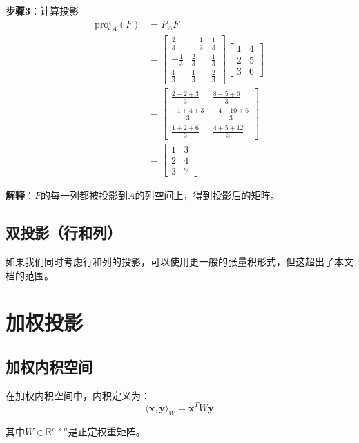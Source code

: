 \documentclass[12pt,a4paper]{article}
\begin{document}
\textbf{步骤3}：计算投影
\begin{align}
\text{proj}_{A}(F) &= P_A F \\
&= \begin{bmatrix} \frac{2}{3} & -\frac{1}{3} & \frac{1}{3} \\ -\frac{1}{3} & \frac{2}{3} & \frac{1}{3} \\ \frac{1}{3} & \frac{1}{3} & \frac{2}{3} \end{bmatrix} \begin{bmatrix} 1 & 4 \\ 2 & 5 \\ 3 & 6 \end{bmatrix} \\
&= \begin{bmatrix} \frac{2-2+3}{3} & \frac{8-5+6}{3} \\ \frac{-1+4+3}{3} & \frac{-4+10+6}{3} \\ \frac{1+2+6}{3} & \frac{4+5+12}{3} \end{bmatrix} \\
&= \begin{bmatrix} 1 & 3 \\ 2 & 4 \\ 3 & 7 \end{bmatrix}
\end{align}

\textbf{解释}：$F$的每一列都被投影到$A$的列空间上，得到投影后的矩阵。

\subsection{双投影（行和列）}

如果我们同时考虑行和列的投影，可以使用更一般的张量积形式，但这超出了本文档的范围。

\section{加权投影}

\subsection{加权内积空间}

在加权内积空间中，内积定义为：
\begin{equation}
\langle \bm{x}, \bm{y} \rangle_W = \bm{x}^T W \bm{y}
\end{equation}

其中$W \in \mathbb{R}^{n \times n}$是正定权重矩阵。
\end{document}
